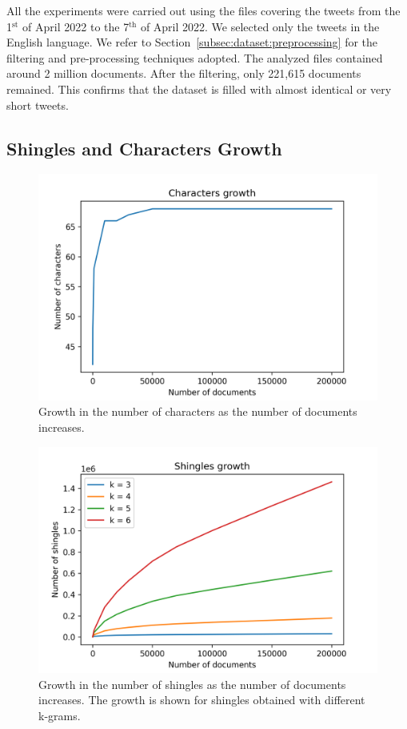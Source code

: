 \documentclass[runningheads]{llncs}
\begin{document}
All the experiments were carried out using the files covering the tweets from the 1$^{\text{st}}$ of April 2022 to the 7$^{\text{th}}$ of April 2022. We selected only the tweets in the English language. We refer to Section~\ref{subsec:dataset:preprocessing} for the filtering and pre-processing techniques adopted. The analyzed files contained around 2 million documents. After the filtering, only 221,615 documents remained. This confirms that the dataset is filled with almost identical or very short tweets. 

\subsection{Shingles and Characters Growth}
\label{subsec:experiments:shingles}

\begin{figure}
  \center
  \includegraphics[width=1\textwidth]{../img/char_growth.png}
  \caption{Growth in the number of characters as the number of documents increases.} 
  \label{fig:experiments:char_growth}
\end{figure}

\begin{figure}
  \center
  \includegraphics[width=1\textwidth]{../img/shingles_growth.png}
  \caption{Growth in the number of shingles as the number of documents increases. The growth is shown for shingles obtained with different k-grams.} 
  \label{fig:experiments:shingles_growth}
\end{figure}
\end{document}
